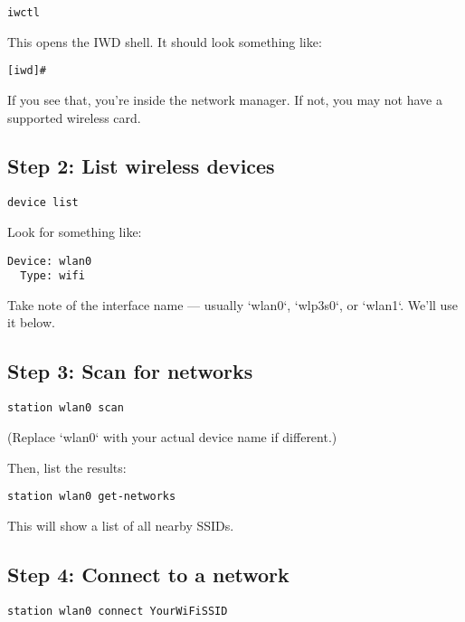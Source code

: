 \documentclass[12pt,openany]{book}
\begin{document}
\begin{lstlisting}
iwctl
\end{lstlisting}

This opens the IWD shell. It should look something like:

\begin{lstlisting}
[iwd]#
\end{lstlisting}

If you see that, you're inside the network manager. If not, you may not have a supported wireless card.

\subsection*{Step 2: List wireless devices}

\begin{lstlisting}
device list
\end{lstlisting}

Look for something like:

\begin{lstlisting}
Device: wlan0
  Type: wifi
\end{lstlisting}

Take note of the interface name — usually `wlan0`, `wlp3s0`, or `wlan1`. We’ll use it below.

\subsection*{Step 3: Scan for networks}

\begin{lstlisting}
station wlan0 scan
\end{lstlisting}

(Replace `wlan0` with your actual device name if different.)

Then, list the results:

\begin{lstlisting}
station wlan0 get-networks
\end{lstlisting}

This will show a list of all nearby SSIDs.

\subsection*{Step 4: Connect to a network}

\begin{lstlisting}
station wlan0 connect YourWiFiSSID
\end{lstlisting}
\end{document}
